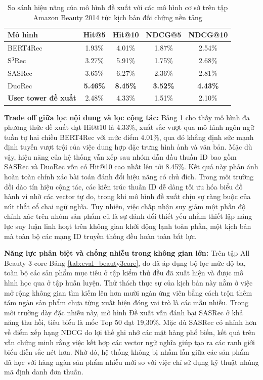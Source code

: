 \begin{table}[H]
\vspace{0.6cm} %

\caption{So sánh hiệu năng của mô hình đề xuất với các mô hình cơ sở trên tập Amazon Beauty 2014 tức kịch bản đối chứng nền tảng}
\label{tab:baseline_comparison}
\renewcommand{\arraystretch}{1.2}
\begin{tabular}{lcccc}
\hline
\textbf{Mô hình} & \textbf{Hit@5} & \textbf{Hit@10} & \textbf{NDCG@5} & \textbf{NDCG@10} \\ \hline
BERT4Rec & 1.93\% & 4.01\% & 1.87\% & 2.54\% \\
S$^3$Rec & 3.27\% & 5.91\% & 1.75\% & 2.68\% \\
SASRec & 3.65\% & 6.27\% & 2.36\% & 2.81\% \\
DuoRec & \textbf{5.46\%} & \textbf{8.45\%} & \textbf{3.52\%} & \textbf{4.43\%} \\ \hline
\textbf{User tower đề xuất} & 2.48\% & 4.33\% & 1.51\% & 2.10\% \\ \hline
\end{tabular}
 
\end{table}

\textbf{Trade off giữa lọc nội dung và lọc cộng tác:} Bảng \ref{tab:baseline_comparison} cho thấy mô hình đa phương thức đề xuất đạt Hit@10 là 4.33\%, xuất sắc vượt qua mô hình ngôn ngữ tuần tự hai chiều BERT4Rec với mức điểm 4.01\%, qua đó khẳng định sức mạnh định tuyến vượt trội của việc dung hợp đặc trưng hình ảnh và văn bản. Mặc dù vậy, hiệu năng của hệ thống vẫn xếp sau nhóm dẫn đầu thuần ID bao gồm SASRec và DuoRec vốn có Hit@10 cao nhất lên tới 8.45\%. Kết quả này phản ánh hoàn toàn chính xác bài toán đánh đổi hiệu năng có chủ đích. Trong môi trường dồi dào tín hiệu cộng tác, các kiến trúc thuần ID dễ dàng tối ưu hóa biểu đồ hành vi nhờ các vector tự do, trong khi mô hình đề xuất chịu sự ràng buộc của nút thắt cổ chai ngữ nghĩa. Tuy nhiên, việc chấp nhận suy giảm một phần độ chính xác trên nhóm sản phẩm cũ là sự đánh đổi thiết yếu nhằm thiết lập năng lực suy luận linh hoạt trên không gian khởi động lạnh toàn phần, một kịch bản mà toàn bộ các mạng ID truyền thống đều hoàn toàn bất lực.

\textbf{Năng lực phân biệt và chống nhiễu trong không gian lớn:} Trên tập All Beauty 3-core Bảng \ref{tab:eval_beauty3core}, do đã áp dụng bộ lọc mức độ ba, toàn bộ các sản phẩm mục tiêu ở tập kiểm thử đều đã xuất hiện và được mô hình học qua ở tập huấn luyện. Thử thách thực sự của kịch bản này nằm ở việc mở rộng không gian tìm kiếm lên hơn mười ngàn ứng viên bằng cách trộn thêm tám ngàn sản phẩm chưa từng xuất hiện đóng vai trò là các mẫu nhiễu. Trong môi trường dày đặc nhiễu này, mô hình Đề xuất vẫn đánh bại SASRec ở khả năng thu hồi, tiêu biểu là mốc Top 50 đạt 19,30\%. Mặc dù SASRec có nhỉnh hơn về điểm xếp hạng NDCG do lợi thế ghi nhớ các mặt hàng phổ biến, kết quả trên vẫn chứng minh rằng việc kết hợp các vector ngữ nghĩa giúp tạo ra các ranh giới biểu diễn sắc nét hơn. Nhờ đó, hệ thống không bị nhầm lẫn giữa các sản phẩm đã học với hàng ngàn sản phẩm nhiễu mới so với việc chỉ sử dụng kỹ thuật nhúng mã định danh đơn thuần.

